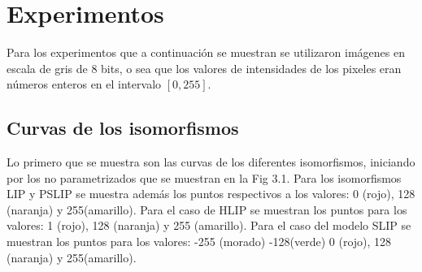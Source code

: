 \section{Experimentos}
Para los experimentos que a continuaci\'on se muestran se utilizaron im\'agenes en escala de gris de 8 bits, o sea que los valores de intensidades de los pixeles eran n\'umeros enteros en el intervalo $[0,255]$.  

\subsection{Curvas de los isomorfismos}
Lo primero que se muestra son las curvas de los diferentes isomorfismos, iniciando por los no parametrizados que se muestran en la Fig 3.1. Para los isomorfismos LIP y PSLIP se muestra adem\'as los puntos respectivos a los valores: 0 (rojo), 128 (naranja) y 255(amarillo). Para el caso de HLIP se muestran los puntos para los valores: 1 (rojo), 128 (naranja) y 255 (amarillo). Para el caso del modelo SLIP se muestran los puntos para los valores: -255 (morado) -128(verde) 0 (rojo), 128 (naranja) y 255(amarillo).

